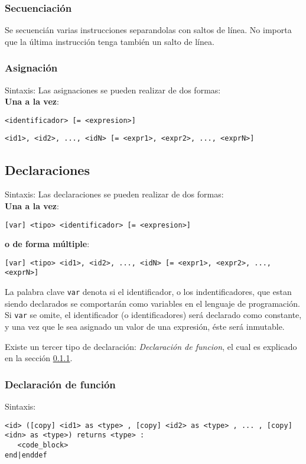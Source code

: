 \documentclass[12pt, spanish]{report}
\begin{document}
\subsubsection{Secuenciaci\'on}
Se secuenci\'an varias instrucciones separandolas con saltos
de l\'inea. No importa que la \'ultima instrucci\'on tenga
tambi\'en un salto de l\'inea.

\subsubsection{Asignaci\'on}
Sintaxis:
Las asignaciones se pueden realizar de dos formas:\\

\textbf{Una a la vez}:
\begin{verbatim}
<identificador> [= <expresion>]
\end{verbatim}

\begin{verbatim}
<id1>, <id2>, ..., <idN> [= <expr1>, <expr2>, ..., <exprN>]
\end{verbatim}

\subsection{Declaraciones}
\label{sec:decl}
Sintaxis:
Las declaraciones se pueden realizar de dos formas:\\

\textbf{Una a la vez}:
\begin{verbatim}
[var] <tipo> <identificador> [= <expresion>]
\end{verbatim}

\textbf{o de forma m\'ultiple}:
\begin{verbatim}
[var] <tipo> <id1>, <id2>, ..., <idN> [= <expr1>, <expr2>, ..., <exprN>]
\end{verbatim}

La palabra clave \texttt{var} denota si el identificador, o los
indentificadores, que estan siendo declarados se comportar\'an como
variables en el lenguaje de programaci\'on. Si \texttt{var} se omite, el
identificador (o identificadores) ser\'a declarado como constante, y una
vez que le sea asignado un valor de una expresi\'on, \'este ser\'a
inmutable.

Existe un tercer tipo de declaraci\'on: \emph{Declaraci\'on de funcion},
el cual es explicado en la secci\'on \ref{sec:func}.

\subsubsection{Declaraci\'on de funci\'on}
\label{sec:func}
Sintaxis:\\
\begin{verbatim}
<id> ([copy] <id1> as <type> , [copy] <id2> as <type> , ... , [copy] <idn> as <type>) returns <type> :
   <code_block>
end|enddef
\end{verbatim}
\end{document}
